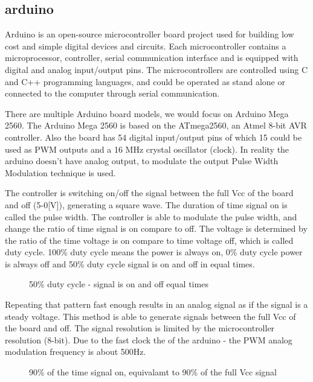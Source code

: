 \documentclass[\main/master.tex]{subfiles}
\begin{document}
\subsection{arduino}
Arduino is an open-source microcontroller board project used for building low cost and simple digital devices and circuits. Each microcontroller contains a microprocessor, controller, serial communication interface and is equipped with digital and analog input/output pins. The microcontrollers are controlled using C and C++ programming languages, and could be operated as stand alone or connected to the computer through serial communication. 
\par
There are multiple Arduino board models, we would focus on Arduino Mega 2560. The Arduino Mega 2560 is based on the ATmega2560, an Atmel 8-bit AVR controller. Also the board has 54 digital input/output pins of which 15 could be used as PWM outputs and a 16 MHz crystal oscillator (clock). In reality the arduino doesn't have analog output, to modulate the output Pulse Width Modulation technique is used.
\par
The controller is switching on/off the signal between the full Vcc of the board and off (5-0[V]), generating a square wave. The duration of time signal on is called the pulse width. The controller is able to modulate the pulse width, and change the ratio of time signal is on compare to off. The voltage is determined by the ratio of the time voltage is on compare to time voltage off, which is called duty cycle. 100\% duty cycle means the power is always on, 0\% duty cycle power is always off and 50\% duty cycle signal is on and off in equal times. 
\par

\begin{figure}[htbp]
	\centering
	\caption[duty cycle 50\%]{50\% duty cycle  - signal is on and off equal times}
	\label{fig:duty50}
\end{figure}
Repeating that pattern fast enough results in an analog signal as if the signal is a steady voltage. This method is able to generate signals between the full Vcc of the board and off. The signal resolution is limited by the microcontroller resolution (8-bit). Due to the fast clock the of the arduino - the PWM analog modulation frequency is about 500Hz.
\par
\begin{figure}[htbp]
	\centering
	\caption[duty cycle 90\%]{90\% of the time signal on, equivalamt to 90\% of the full Vcc signal}
	\label{fig:duty90}
\end{figure}
\end{document}
